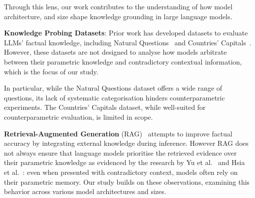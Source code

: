 Through this lens, our work contributes to the understanding of how model architecture, and size shape knowledge grounding in large language models.

\textbf{Knowledge Probing Datasets}: Prior work has developed datasets to evaluate LLMs' factual knowledge, including Natural Questions~\cite{natural_questions} and Countries' Capitals~\cite{factual_recall}. However, these datasets are not designed to analyse how models arbitrate between their parametric knowledge and contradictory contextual information, which is the focus of our study.

In particular, while the Natural Questions dataset offers a wide range of questions, its lack of systematic categorisation hinders counterparametric experiments.
The Countries' Capitals dataset, while well-suited for counterparametric evaluation, is limited in scope.

\textbf{Retrieval-Augmented Generation} (RAG)~\cite{rag} attempts to improve factual accuracy by integrating external knowledge during inference.
However RAG does not always ensure that language models prioritise the retrieved evidence over their parametric knowledge as evidenced by the research by Yu et al.~\cite{factual_recall} and Hsia et al.~\cite{ragged}: even when presented with contradictory context, models often rely on their parametric memory.
Our study builds on these observations, examining this behavior across various model architectures and sizes.

